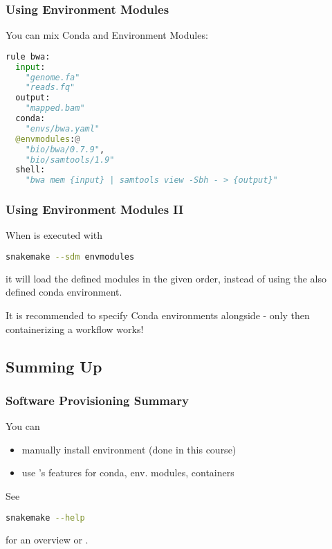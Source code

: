 \begin{frame}[fragile]
  \frametitle{Using Environment Modules}
  You can mix Conda and Environment Modules:
  \begin{lstlisting}[language=Python,style=Python]
rule bwa:
  input:
    "genome.fa"
    "reads.fq"
  output:
    "mapped.bam"
  conda:
    "envs/bwa.yaml"
  @envmodules:@
    "bio/bwa/0.7.9",
    "bio/samtools/1.9"
  shell:
    "bwa mem {input} | samtools view -Sbh - > {output}"
  \end{lstlisting}
\end{frame}

\begin{frame}[fragile]
  \frametitle{Using Environment Modules II}
  When \Snakemake{} is executed with 
  \begin{lstlisting}[language=Bash, style=Shell]
snakemake --sdm envmodules
  \end{lstlisting}
  it will load the defined modules in the given order, instead of using the also defined conda environment.
  \pause
  \begin{hint}
  	It is recommended to specify Conda environments alongside - only then containerizing a workflow works!
  \end{hint}
\end{frame}

\subsection{Summing Up}

\begin{frame}[fragile]
  \frametitle{Software Provisioning Summary}
  You can
  \begin{itemize}
  	\item manually install environment (done in this course)
  	\item use \Snakemake's features for conda, env. modules, containers
  \end{itemize}
   See 
   \begin{lstlisting}[language=Bash, style=Shell]
snakemake --help
   \end{lstlisting}
   for an overview or .
\end{frame} 